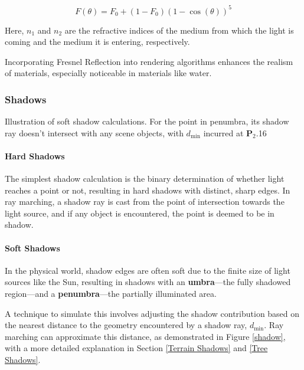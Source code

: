 \begin{equation}
\label{schlick}
F(\theta) = F_0 + (1 - F_0)(1 - \cos(\theta))^5
\end{equation}

Here, $n_1$ and  $n_2$ are the refractive indices of the medium from which the light is coming and the medium it is entering, respectively.

Incorporating Fresnel Reflection into rendering algorithms enhances the realism of materials, especially noticeable in materials like water. 

\subsubsection{Shadows}
\label{Shadows}

{Illustration of soft shadow calculations. For the point in penumbra, its shadow ray doesn't intersect with any scene objects, with $d_{\text{min}}$ incurred at $\mathbf{P}_2$.}{16}


\paragraph{Hard Shadows}
The simplest shadow calculation is the binary determination of whether light reaches a point or not, resulting in hard shadows with distinct, sharp edges. In ray marching, a shadow ray is cast from the point of intersection towards the light source, and if any object is encountered, the point is deemed to be in shadow.

\paragraph{Soft Shadows}

In the physical world, shadow edges are often soft due to the finite size of light sources like the Sun, resulting in shadows with an \textbf{umbra}—the fully shadowed region—and a \textbf{penumbra}—the partially illuminated area.

A technique to simulate this involves adjusting the shadow contribution based on the nearest distance to the geometry encountered by a shadow ray, $d_{\text{min}}$. Ray marching can approximate this distance, as demonstrated in Figure \ref{shadow}, with a more detailed explanation in Section \ref{Terrain Shadows} and \ref{Tree Shadows}.


